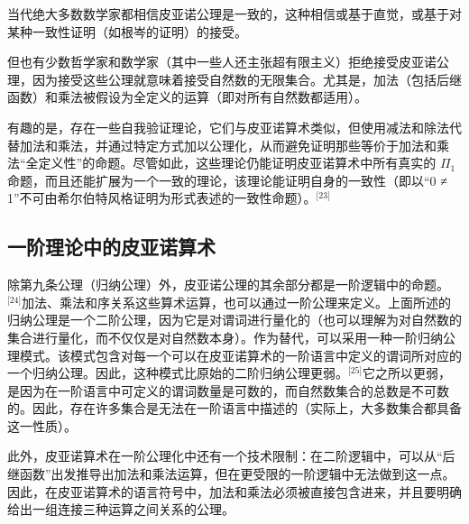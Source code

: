 当代绝大多数数学家都相信皮亚诺公理是一致的，这种相信或基于直觉，或基于对某种一致性证明（如根岑的证明）的接受。

但也有少数哲学家和数学家（其中一些人还主张超有限主义）拒绝接受皮亚诺公理，因为接受这些公理就意味着接受自然数的无限集合。尤其是，加法（包括后继函数）和乘法被假设为全定义的运算（即对所有自然数都适用）。

有趣的是，存在一些自我验证理论，它们与皮亚诺算术类似，但使用减法和除法代替加法和乘法，并通过特定方式加以公理化，从而避免证明那些等价于加法和乘法“全定义性”的命题。尽管如此，这些理论仍能证明皮亚诺算术中所有真实的 $\Pi_1$ 命题，而且还能扩展为一个一致的理论，该理论能证明自身的一致性（即以“0 ≠ 1”不可由希尔伯特风格证明为形式表述的一致性命题）。\(^\text{[23]}\)
\subsection{一阶理论中的皮亚诺算术}
除第九条公理（归纳公理）外，皮亚诺公理的其余部分都是一阶逻辑中的命题。\(^\text{[24]}\)加法、乘法和序关系这些算术运算，也可以通过一阶公理来定义。上面所述的归纳公理是一个二阶公理，因为它是对谓词进行量化的（也可以理解为对自然数的集合进行量化，而不仅仅是对自然数本身）。作为替代，可以采用一种一阶归纳公理模式。该模式包含对每一个可以在皮亚诺算术的一阶语言中定义的谓词所对应的一个归纳公理。因此，这种模式比原始的二阶归纳公理更弱。\(^\text{[25]}\)它之所以更弱，是因为在一阶语言中可定义的谓词数量是可数的，而自然数集合的总数是不可数的。因此，存在许多集合是无法在一阶语言中描述的（实际上，大多数集合都具备这一性质）。

此外，皮亚诺算术在一阶公理化中还有一个技术限制：在二阶逻辑中，可以从“后继函数”出发推导出加法和乘法运算，但在更受限的一阶逻辑中无法做到这一点。因此，在皮亚诺算术的语言符号中，加法和乘法必须被直接包含进来，并且要明确给出一组连接三种运算之间关系的公理。

